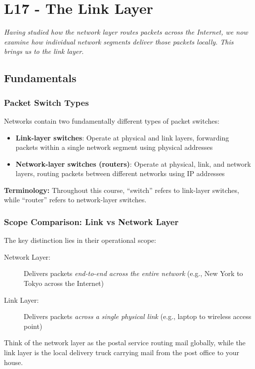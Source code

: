 \documentclass[../../compsys.tex]{subfiles}
\begin{document}
\raggedbottom
\chapter{L17 - The Link Layer}
\vfill
\textit{Having studied how the network layer routes packets across the Internet, we now examine how individual network segments deliver those packets locally. This brings us to the link layer.}

\section{Fundamentals}

\subsection{Packet Switch Types}

Networks contain two fundamentally different types of packet switches:

\begin{itemize}
    \item \textbf{Link-layer switches}: Operate at physical and link layers, forwarding packets within a single network segment using physical addresses
    \item \textbf{Network-layer switches (routers)}: Operate at physical, link, and network layers, routing packets between different networks using IP addresses
\end{itemize}

\textbf{Terminology:} Throughout this course, ``switch'' refers to link-layer switches, while ``router'' refers to network-layer switches.

\subsection{Scope Comparison: Link vs Network Layer}

The key distinction lies in their operational scope:

\begin{description}
    \item[Network Layer:] Delivers packets \emph{end-to-end across the entire network} (e.g., New York to Tokyo across the Internet)
    \item[Link Layer:] Delivers packets \emph{across a single physical link} (e.g., laptop to wireless access point)
\end{description}

Think of the network layer as the postal service routing mail globally, while the link layer is the local delivery truck carrying mail from the post office to your house.
\end{document}
